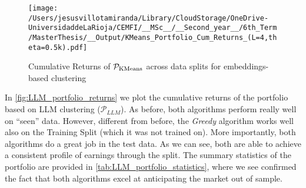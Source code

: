 \begin{figure}[H]
  \centering
    \caption{Cumulative Returns of $\mathcal{P}_{\text{KMeans}}$ across data splits for embeddings-based clustering}
  \texttt{[image: /Users/jesusvillotamiranda/Library/CloudStorage/OneDrive-UniversidaddeLaRioja/CEMFI/\_\_MSc\_\_/\_\_Second\_year\_\_/6th\_Term/MasterThesis/\_\_Output/KMeans\_Portfolio\_Cum\_Returns\_(L=4,theta=0.5k).pdf]}
  \label{fig:KMeans_Portfolio_Cum_Returns}
\end{figure}







%
%

\mx 
In \cref{fig:LLM_portfolio_returns} we plot the cumulative returns of the portfolio based on LLM clustering ($\mathcal P_{LLM}$). As before, both algorithms perform really well on ``seen'' data. However, different from before, the \textit{Greedy} algorithm works well also on the Training Split (which it was not trained on). More importantly, both algorithms do a great job in the test data. As we can see, both are able to achieve a consistent profile of earnings through the split. 
%
The summary statistics of the portfolio are provided in \cref{tab:LLM_portfolio_statistics}, where we see confirmed the fact that both algorithms excel at 
anticipating the market out of sample. 

